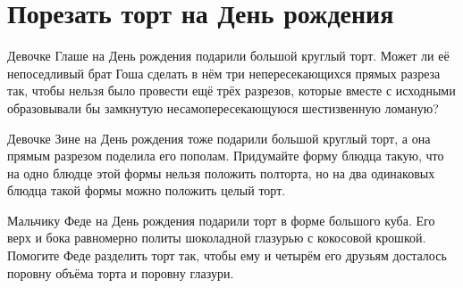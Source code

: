\section{Порезать торт на День рождения}
\begin{itemize}

\itA Девочке Глаше на День рождения подарили большой круглый торт. Может ли её непоседливый брат Гоша сделать в нём три непересекающихся прямых разреза так, чтобы нельзя было провести ещё трёх разрезов, которые вместе с исходными образовывали бы замкнутую несамопересекающуюся шестизвенную ломаную?

\itB Девочке Зине на День рождения тоже подарили большой круглый торт, а она прямым разрезом поделила его пополам. Придумайте форму блюдца такую, что на одно блюдце этой формы нельзя положить полторта, но на два одинаковых блюдца такой формы можно положить целый торт.

\itC Мальчику Феде на День рождения подарили торт в форме большого куба. Его верх и бока равномерно политы шоколадной глазурью с кокосовой крошкой. Помогите Феде разделить торт так, чтобы ему и четырём его друзьям досталось поровну объёма торта и поровну глазури.
\end{itemize}